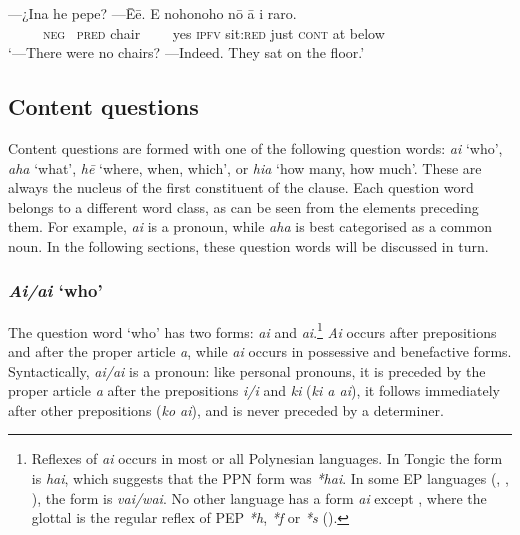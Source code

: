 \ea\label{ex:10.27}
\gll —¿{\ꞌ}Ina he pepe? —{\ꞌ}Ēē. E nohonoho nō {\ꞌ}ā {\ꞌ}i raro. \\
~~~~~\textsc{neg~} \textsc{pred} chair ~~~~yes \textsc{ipfv} sit:\textsc{red} just \textsc{cont} at below \\

\glt 
‘—There were no chairs? —Indeed. They sat on the floor.’ \textstyleExampleref{[R413.635]} 
\z

\subsection{Content questions}\label{sec:10.3.2}
Content questions are formed with one of the following question words: \textit{ai} ‘who’, \textit{aha} ‘what’, \textit{hē} ‘where, when, which’, or \textit{hia} ‘how many, how much’. These are always the nucleus of the first constituent of the clause.
Each question word belongs to a different word class, as can be seen from the elements preceding them. For example, \textit{ai} is a pronoun, while \textit{aha} is best categorised as a common noun. In the following sections, these question words will be discussed in turn.

\subsubsection{\textit{Ai/{\ꞌ}ai} ‘who’}\label{sec:10.3.2.1}
The question word ‘who’ has two forms: \textit{ai} and \textit{{\ꞌ}ai}.\footnote{\label{fn:486}Reflexes of \textit{ai} occurs in most or all Polynesian languages. In Tongic the form is \textit{hai}, which suggests that the PPN form was \textit{*hai}. In some EP languages (, , ), the form is \textit{vai/wai}. No other language has a form \textit{{\ꞌ}ai} except , where the glottal is the regular reflex of PEP \textit{*h}, \textit{*f} or \textit{*s} ().} \textit{Ai} occurs after prepositions and after the proper article \textit{a}, while \textit{{\ꞌ}ai} occurs in possessive and benefactive forms. Syntactically, \textit{ai/{\ꞌ}ai} is a pronoun: like personal pronouns, it is preceded by the proper article \textit{a} after the prepositions \textit{{\ꞌ}i/i} and \textit{ki} (\textit{ki a ai}), it follows immediately after other prepositions (\textit{ko ai}), and is never preceded by a determiner. 

